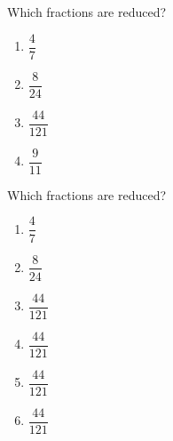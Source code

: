 \documentclass{article}
\begin{document}
Which fractions are reduced?
\begin{enumerate}[twocol]
	\item $\dfrac{4}{7}$
	\item $\dfrac{8}{24}$
	\item $\dfrac{44}{121}$
	\item $\dfrac{9}{11}$
\end{enumerate}

Which fractions are reduced?
\begin{enumerate}[threecol]
	\item $\dfrac{4}{7}$
	\item $\dfrac{8}{24}$
	\item $\dfrac{44}{121}$
	\item $\dfrac{44}{121}$
	\item $\dfrac{44}{121}$
	\item $\dfrac{44}{121}$
\end{enumerate}
\end{document}
